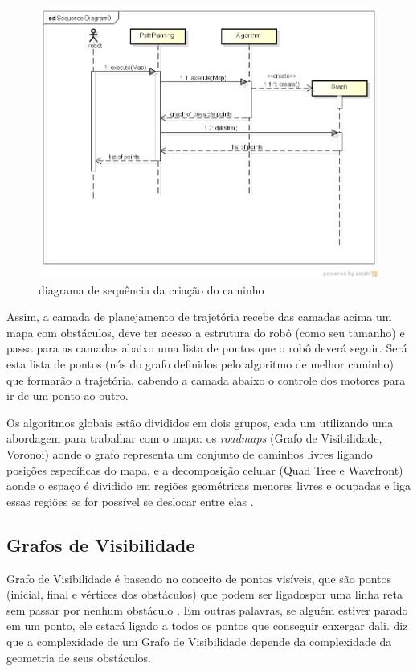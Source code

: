 \begin{figure}[h]
	\centering
	\label{fig06}
		\includegraphics[keepaspectratio=true,scale=0.6]{figuras/5diagramaSequencia.png}
	\caption{diagrama de sequência da criação do caminho}
\end{figure}

Assim, a camada de planejamento de trajetória recebe das camadas acima um mapa com obstáculos, deve ter acesso a estrutura do robô (como seu tamanho) e passa para as camadas abaixo uma lista de pontos que o robô deverá seguir. Será esta lista de pontos (nós do grafo definidos pelo algoritmo de melhor caminho) que formarão a trajetória, cabendo a camada abaixo o controle dos motores para ir de um ponto ao outro.

Os algoritmos globais estão divididos em dois grupos, cada um utilizando uma abordagem para trabalhar com o mapa: os \textit{roadmaps} (Grafo de Visibilidade, Voronoi) aonde o grafo representa um conjunto de caminhos livres ligando posições específicas do mapa, e a decomposição celular (Quad Tree e Wavefront) aonde o espaço é dividido em regiões geométricas menores livres e ocupadas e liga essas regiões se for possível se deslocar entre elas \cite{Souza2008}.

\subsection{Grafos de Visibilidade}

Grafo de Visibilidade é baseado no conceito de pontos visíveis, que são pontos (inicial, final e vértices dos obstáculos) que podem ser ligadospor uma linha reta sem passar por nenhum obstáculo \cite{Guzman2008}. Em outras palavras, se alguém estiver parado em um ponto, ele estará ligado a todos os pontos que conseguir enxergar dali. \cite{Souza2008} diz que a complexidade de um Grafo de Visibilidade depende da complexidade da geometria de seus obstáculos.

